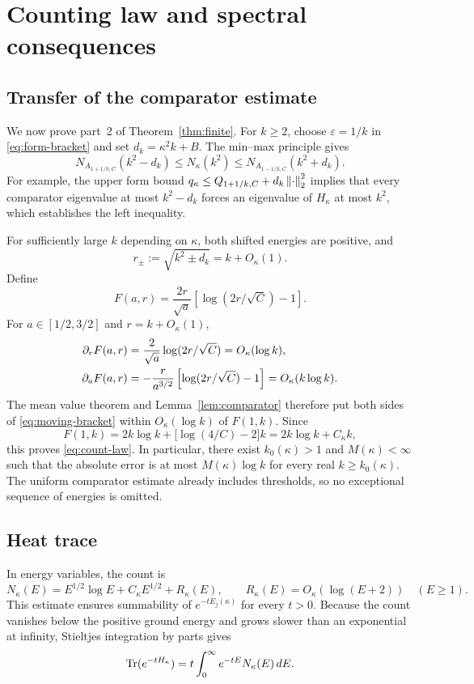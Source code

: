 \section{Counting law and spectral consequences}
\label{sec:counting}

\subsection{Transfer of the comparator estimate}

We now prove part~2 of Theorem~\ref{thm:finite}.
For $k\ge2$, choose $\varepsilon=1/k$ in
\eqref{eq:form-bracket} and set $d_k=\kappa^2k+B$.
The min--max principle gives
\begin{equation}
N_{A_{1+1/k,C}}(k^2-d_k)
\le N_\kappa(k^2)
\le N_{A_{1-1/k,C}}(k^2+d_k).
\label{eq:moving-bracket}
\end{equation}
For example, the upper form bound
$q_\kappa\le Q_{1+1/k,C}+d_k\left\lVert \cdot\right\rVert_2^2$
implies that every comparator eigenvalue at most
$k^2-d_k$ forces an eigenvalue of $H_\kappa$ at most
$k^2$, which establishes the left inequality.

For sufficiently large $k$ depending on $\kappa$,
both shifted energies are positive, and
\[
r_\pm:=\sqrt{k^2\pm d_k}=k+O_\kappa(1).
\]
Define
\[
F(a,r)=\frac{2r}{\sqrt a}
                \left[\log(2r/\sqrt C)-1\right].
\]
For $a\in[1/2,3/2]$ and $r=k+O_\kappa(1)$,
\begin{align}
\partial_rF(a,r)
 &=\frac2{\sqrt a}\log(2r/\sqrt C)
   =O_\kappa(\log k),\notag\\
\partial_aF(a,r)
 &=-\frac r{a^{3/2}}\left[\log(2r/\sqrt C)-1\right]
   =O_\kappa(k\log k).
\label{eq:comparison-derivatives}
\end{align}
The mean value theorem and Lemma~\ref{lem:comparator}
therefore put both sides of \eqref{eq:moving-bracket}
within $O_\kappa(\log k)$ of $F(1,k)$.
Since
\[
F(1,k)=2k\log k+\bigl[\log(4/C)-2\bigr]k
      =2k\log k+C_\kappa k,
\]
this proves \eqref{eq:count-law}.
In particular, there exist $k_0(\kappa)>1$ and
$M(\kappa)<\infty$ such that the absolute error is at most
$M(\kappa)\log k$ for every real $k\ge k_0(\kappa)$.
The uniform comparator estimate already includes thresholds,
so no exceptional sequence of energies is omitted.

\subsection{Heat trace}

In energy variables, the count is
\begin{equation}
N_\kappa(E)
=E^{1/2}\log E+C_\kappa E^{1/2}+R_\kappa(E),
\qquad
R_\kappa(E)=O_\kappa(\log(E+2))\quad(E\ge1).
\label{eq:energy-count}
\end{equation}
This estimate ensures summability of $e^{-tE_j(\kappa)}$
for every $t>0$.
Because the count vanishes below the positive ground energy
and grows slower than an exponential at infinity,
Stieltjes integration by parts gives
\begin{equation}
\operatorname{Tr}(e^{-tH_\kappa})
=t\int_0^\infty e^{-tE}N_\kappa(E)\,dE.
\label{eq:heat-stieltjes}
\end{equation}

